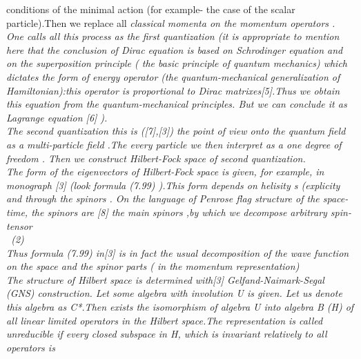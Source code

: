 \documentclass[a4paper,12pt] {article}
\begin{document}
conditions of the minimal action  (for example- the case of the scalar particle).Then we replace  all  \it
classical \rm   momenta on the momentum operators \coordHE{}. One calls all this
 process as the \it  first quantization \rm   (it is appropriate to mention here that the conclusion of Dirac
equation is based on  Schrodinger equation and on the superposition principle ( the basic
principle of  quantum mechanics) which dictates the form of energy operator (the quantum-mechanical
generalization of Hamiltonian):this operator is proportional to  Dirac matrixes[5].Thus we obtain this
equation from the \it quantum-mechanical principles\rm . But we can conclude it as  Lagrange equation
[6]  ).
\\\it The second quantization \rm this is ([7],[3]) the  point of view onto the quantum field as a
 \it multi-particle field \rm .The every particle we then interpret as a \it one degree of freedom \rm .
Then we construct   \it Hilbert-Fock space of second quantization\rm  .
\\The form of the  eigenvectors of Hilbert-Fock space is given, for example, in monograph [3]
 (look formula (7.99) ).This form depends on helisity s (explicity and through the spinors
 \coordHE{}. On the language of Penrose \it flag \rm  structure of the space-time, the  spinors
\coordHE{} are [8]  \it the main spinors \rm ,by which we decompose  arbitrary spin-tensor
  \\\coordHE{}
\ (2)
\\Thus  formula (7.99) in[3] is in fact the usual decomposition of the wave function on the space and  the
 spinor parts ( in the  momentum representation)
\\The structure of Hilbert space is determined with[3]  \it  Gelfand-Naimark-Segal \\\rm (\it GNS\rm)\it
construction.
 \rm Let some algebra with involution U is given. Let us denote this algebra as C*.Then  exists the
 isomorphism \myHighlight{$ \pi$}\coordHE{} of algebra U into  algebra B (\it H\rm) of all linear limited operators in the Hilbert
 space.The representation \myHighlight{$ \pi$}\coordHE{} is called \it unreducible \rm if  every closed subspace in \it H\rm , which
is invariant relatively to all operators  \coordHE{} is
\end{document}
